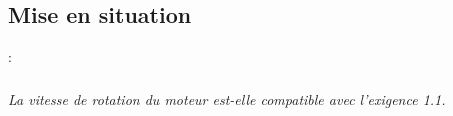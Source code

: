 \documentclass[10pt]{article}
\begin{document}

 \renewcommand{\baselinestretch}{1.2}
\setlength{\parskip}{0ex plus 0.5ex minus 0.2ex}


\subsection*{Mise en situation}

\vspace{.25cm}

\begin{minipage}[c]{.7\linewidth}
 :
\end{minipage} \hfill
\begin{minipage}[c]{.27\linewidth}
\begin{center}
\end{center}
\end{minipage}


\subparagraph{}
\textit{La vitesse de rotation du moteur est-elle compatible avec l'exigence 1.1.}
\end{document}
